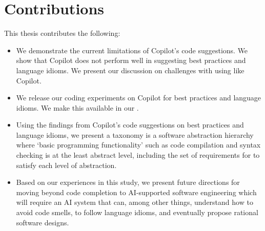 \section{Contributions}

This thesis contributes the following:

\begin{itemize}
    \item We demonstrate the current limitations of Copilot's code suggestions. We show that Copilot does not perform well in suggesting best practices and language idioms. We present our discussion on challenges with using \cct{} like Copilot.
    \item We release our coding experiments on Copilot for best practices and language idioms. We make this available in our \repl{}.
    \item Using the findings from Copilot's code suggestions on best practices and language idioms, we present a taxonomy is a software abstraction hierarchy where ‘basic programming functionality’ such as code compilation and syntax checking is at the least abstract level, including the set of requirements for \cct{} to satisfy each level of abstraction.
    \item Based on our experiences in this study, we present future directions for moving beyond code completion to AI-supported software engineering which will require an AI system that can, among other things, understand how to avoid code smells, to follow language idioms, and eventually propose rational software designs.
\end{itemize}
